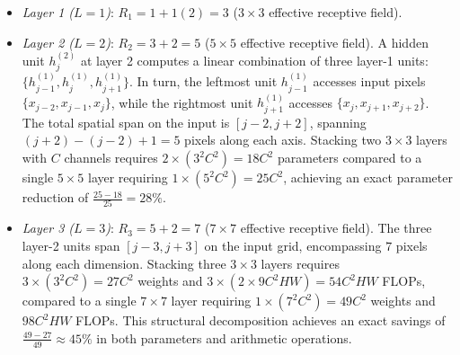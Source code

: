 \begin{itemize}[leftmargin=*]
  \item \textit{Layer 1 ($L=1$)}: $R_1 = 1 + 1(2) = 3$ ($3 \times 3$ effective receptive field).
  \item \textit{Layer 2 ($L=2$)}: $R_2 = 3 + 2 = 5$ ($5 \times 5$ effective receptive field). A hidden unit $h_j^{(2)}$ at layer 2 computes a linear combination of three layer-1 units: $\{h_{j-1}^{(1)}, h_j^{(1)}, h_{j+1}^{(1)}\}$. In turn, the leftmost unit $h_{j-1}^{(1)}$ accesses input pixels $\{x_{j-2}, x_{j-1}, x_j\}$, while the rightmost unit $h_{j+1}^{(1)}$ accesses $\{x_j, x_{j+1}, x_{j+2}\}$. The total spatial span on the input is $[j-2, j+2]$, spanning $(j+2) - (j-2) + 1 = 5$ pixels along each axis. Stacking two $3 \times 3$ layers with $C$ channels requires $2 \times (3^2 C^2) = 18 C^2$ parameters compared to a single $5 \times 5$ layer requiring $1 \times (5^2 C^2) = 25 C^2$, achieving an exact parameter reduction of $\frac{25 - 18}{25} = 28\%$.
  \item \textit{Layer 3 ($L=3$)}: $R_3 = 5 + 2 = 7$ ($7 \times 7$ effective receptive field). The three layer-2 units span $[j-3, j+3]$ on the input grid, encompassing $7$ pixels along each dimension. Stacking three $3 \times 3$ layers requires $3 \times (3^2 C^2) = 27 C^2$ weights and $3 \times (2 \times 9 C^2 HW) = 54 C^2 HW$ FLOPs, compared to a single $7 \times 7$ layer requiring $1 \times (7^2 C^2) = 49 C^2$ weights and $98 C^2 HW$ FLOPs. This structural decomposition achieves an exact savings of $\frac{49 - 27}{49} \approx 45\%$ in both parameters and arithmetic operations.
\end{itemize}

